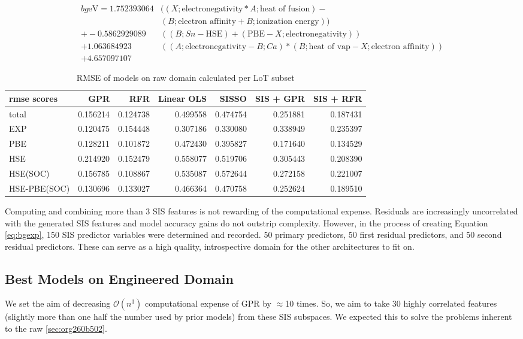 \begin{align}
\label{eq:bgexp}
bg\si{\electronvolt} = 1.752393064 &((X;\mbox{electronegativity}*A;\mbox{heat of fusion})-\\&(B;\mbox{electron affinity}+B;\mbox{ionization energy}))\nonumber\\+-0.5862929089 &((B;Sn-\mbox{HSE})+(\mbox{PBE}-X;\mbox{electronegativity}))\nonumber\\+1.063684923 &((A;\mbox{electronegativity}-B;Ca)*(B;\mbox{heat of vap}-X;\mbox{electron affinity}))\nonumber\\+4.657097107
\end{align}

\begin{table}[htbp]
\caption{\label{tbl:LoTscores} RMSE of models on raw domain calculated per LoT subset}
\centering
\begin{tabular}{lrrrrrr}
rmse scores & GPR & RFR & Linear OLS & SISSO & SIS + GPR & SIS + RFR\\[0pt]
\hline
total & 0.156214 & 0.124738 & 0.499558 & 0.474754 & 0.251881 & 0.187431\\[0pt]
EXP & 0.120475 & 0.154448 & 0.307186 & 0.330080 & 0.338949 & 0.235397\\[0pt]
PBE & 0.128211 & 0.101872 & 0.472430 & 0.395827 & 0.171640 & 0.134529\\[0pt]
HSE & 0.214920 & 0.152479 & 0.558077 & 0.519706 & 0.305443 & 0.208390\\[0pt]
HSE(SOC) & 0.156785 & 0.108867 & 0.535087 & 0.572644 & 0.272158 & 0.221007\\[0pt]
HSE-PBE(SOC) & 0.130696 & 0.133027 & 0.466364 & 0.470758 & 0.252624 & 0.189510\\[0pt]
\end{tabular}
\end{table}

Computing and combining more than 3 SIS features is not rewarding of the computational expense.
Residuals are increasingly uncorrelated with the generated SIS features and model accuracy gains do not outstrip complexity.
However, in the process of creating Equation \ref{eq:bgexp}, 150 SIS predictor variables were determined and recorded.
50 primary predictors, 50 first residual predictors, and 50 second residual predictors.
These can serve as a high quality, introspective domain for the other architectures to fit on.

\subsection{Best Models on Engineered Domain}
\label{sec:orgaed6a48}
We set the aim of decreasing \(\mathcal{O}(n^3)\) computational expense of GPR by \(\approx\)10 times.
So, we aim to take 30 highly correlated features (slightly more than one half the number used by prior models) from these SIS subspaces.
We expected this to solve the problems inherent to the raw \ref{sec:org260b502}.

